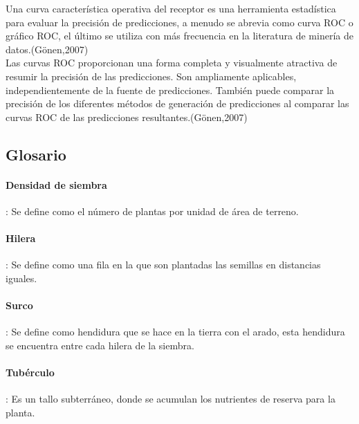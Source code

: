 Una curva característica operativa del receptor es una herramienta estadística para evaluar la precisión de predicciones, a menudo se abrevia como curva ROC o gráfico ROC, el último se utiliza con más frecuencia en la literatura de minería de datos.(Gönen,2007)\\

Las curvas ROC proporcionan una forma completa y visualmente atractiva de resumir la precisión de las predicciones. Son ampliamente aplicables, independientemente de la fuente de predicciones. También puede comparar la precisión de los diferentes métodos de generación de predicciones al comparar las curvas ROC de las predicciones resultantes.(Gönen,2007)


\subsection{Glosario}

\paragraph{Densidad de siembra}: Se define como el número de plantas por unidad de área de terreno.

\paragraph{Hilera}: Se define como una fila en la que son plantadas las semillas en distancias iguales.

\paragraph{Surco}: Se define como hendidura que se hace en la tierra con el arado, esta hendidura se encuentra entre cada hilera de la siembra.

\paragraph{Tubérculo}: Es un tallo subterráneo, donde se acumulan los nutrientes de reserva para la planta.



